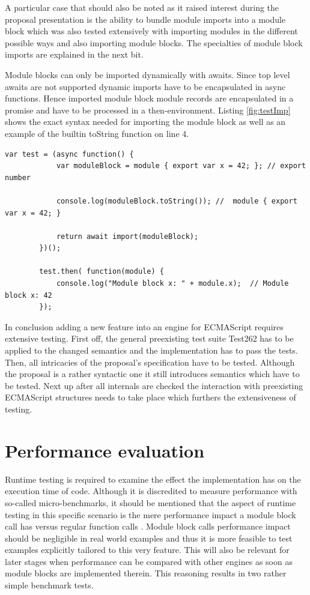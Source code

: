 A particular case that should also be noted as it raised interest during the proposal presentation is the ability to bundle module imports into a module block which was also tested extensively with importing modules in the different possible ways and also importing module blocks. The specialties of module block imports are explained in the next bit.

Module blocks can only be imported dynamically with awaits. Since top level awaits are not supported dynamic imports have to be encapsulated in async functions. Hence imported module block module records are encapsulated in a promise and have to be processed in a \linebreak then-environment. Listing \ref{fig:testImp} shows the exact syntax needed for importing the module block as well as an example of the builtin toString function on line 4.

    \begin{lstlisting}[caption={Module block dynamic import test}, label={fig:testImp}]
        var test = (async function() {
            var moduleBlock = module { export var x = 42; }; // export number
            
            console.log(moduleBlock.toString()); //  module { export var x = 42; }
            
            return await import(moduleBlock);
        })();
        
        test.then( function(module) {
            console.log("Module block x: " + module.x);  // Module block x: 42
        });
    \end{lstlisting}

In conclusion adding a new feature into an engine for ECMAScript requires extensive testing. First off, the general preexisting test suite Test262 has to be applied to the changed semantics and the implementation has to pass the tests. Then, all intricacies of the proposal's specification have to be tested. Although the proposal is a rather syntactic one it still introduces semantics which have to be tested. Next up after all internals are checked the interaction with preexisting ECMAScript structures needs to take place which furthers the extensiveness of testing.

\section{Performance evaluation}

Runtime testing is required to examine the effect the implementation has on the execution time of code.  Although it is discredited to measure performance with so-called micro-benchmarks, it should be mentioned that the aspect of runtime testing in this specific scenario is the mere performance impact a module block call has versus regular function calls \cite{HennessyJohnL2007Ca:a}. Module block calls performance impact should be negligible in real world examples and thus it is more feasible to test examples explicitly tailored to this very feature. This will also be relevant for later stages when performance can be compared with other engines as soon as module blocks are implemented therein. This reasoning results in two rather simple benchmark tests.

